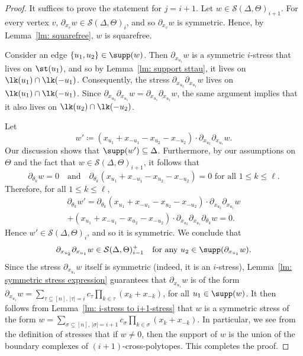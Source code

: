 \begin{proof}
	It suffices to prove the statement for $j=i+1$. Let $w\in \mathcal{S}(\Delta, \Theta)_{i+1}$. For every vertex $v$, $\partial_{x_v} w\in \mathcal{S}(\Delta, \Theta)_i$, and so $\partial_{x_v} w$ is symmetric. Hence, by Lemma~\ref{lm: squarefree}, $w$ is squarefree. 
	
	Consider an edge $\{u_1, u_2\}\in \supp(w)$. Then $\partial_{x_{u_1}} w$ is a symmetric $i$-stress that lives on $\st( u_1)$, and so by Lemma~\ref{lm: support sttau}, it lives on $\lk (u_1)\cap \lk (-u_1)$. Consequently, the stress $\partial_{x_{u_2}}\partial_{x_{u_1}} w$ lives on $\lk(u_1)\cap \lk(-u_1)$. Since $\partial_{x_{u_2}}\partial_{x_{u_1}} w=\partial_{x_{u_1}}\partial_{x_{u_2}} w$, the same argument implies that it also lives on $\lk(u_2)\cap \lk(-u_2)$. 
	
	Let $$w'\coloneqq (x_{u_1}+x_{-u_1}-x_{u_2}-x_{-u_2})\cdot \partial_{x_{u_2}}\partial_{x_{u_1}} w.$$ Our discussion shows that $\supp(w')\subseteq \Delta$. Furthermore, by our assumptions on $\Theta$ and the fact that $w\in \mathcal{S}(\Delta, \Theta)_{i+1}$, it follows that $$\partial_{\theta_k} w=0 \quad \mbox{and} \quad \partial_{\theta_k}(x_{u_1}+x_{-u_1}-x_{u_2}-x_{-u_2})=0 \mbox{ for all $1\leq k\leq \ell$.}$$ Therefore, for all $1\leq k\leq \ell$,
\begin{multline*}
\partial_{\theta_k} w' =
\partial_{\theta_k}(x_{u_1}+x_{-u_1}-x_{u_2}-x_{-u_2}) \cdot \partial_{x_{u_2}}\partial_{x_{u_1}} w \\ 
+(x_{u_1} + x_{-u_1}-x_{u_2}-x_{-u_2}) \cdot\partial_{x_{u_2}}\partial_{x_{u_1}} \partial_{\theta_k}w = 0.
\end{multline*}
	Hence $w'\in \mathcal{S}(\Delta, \Theta)_i$, and so it is symmetric. We conclude that $$\partial_{x_{u_2}}\partial_{x_{u_1}} w\in \mathcal{S}(\Delta, \Theta)^+_{i-1} \quad \mbox{for any $u_2\in \supp(\partial_{x_{u_1}} w)$.}$$ Since the stress $\partial_{x_{u_1}}w$ itself is symmetric (indeed, it is an $i$-stress), Lemma~\ref{lm: symmetric stress expression} guarantees that $\partial_{x_{u_1}}w$ is of the form $\partial_{x_{u_1}} w=\sum_{\tau\subseteq [n], \, |\tau|=i} c_\tau \prod_{k\in \tau} (x_k+x_{-k})$, for all $u_1\in\supp(w)$. It then follows from Lemma~\ref{lm: i-stress to i+1-stress} that $w$ is a symmetric stress of the form $w=\sum_{\sigma\subseteq [n], \, |\sigma|=i+1} c_\sigma \prod_{k\in \sigma} (x_k+x_{-k})$. In particular, we see from the definition of stresses that if $w\neq 0$, then the support of $w$ is the union of the boundary complexes of $(i+1)$-cross-polytopes. This completes the proof.
\end{proof}
